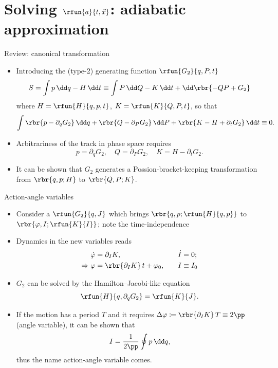 \documentclass{beamer}
\begin{document}
\section{Solving $\rfun{a}{t,\vec{x}}$: adiabatic approximation}

\begin{frame}{Review: canonical transformation}
\begin{itemize}
\item Introducing the (type-2) generating function $\rfun{G_2}{q, P, t}$
\begin{equation}
S = \int p\,\dd q - H \,\dd t
\equiv \int P\,\dd Q - K\,\dd t + \dd \rbr{-QP + G_2}
\end{equation}
where $H = \rfun{H}{q, p, t}$, $K = \rfun{K}{Q, P, t}$, so that
\begin{equation}
\int \rbr{p - \partial_q G_2}\,\dd q + \rbr{Q - \partial_P G_2}\,\dd P 
+ \rbr{K - H + \partial_t G_2}\,\dd t\equiv 0.
\end{equation}
\item Arbitrariness of the track in phase space requires
\begin{equation}
p = \partial_q G_2,\quad
Q = \partial_P G_2,\quad
K = H - \partial_t G_2.
\end{equation}
\item It can be shown that $G_2$ generates a Possion-bracket-keeping 
transformation from $\rbr{q, p; H}$ to $\rbr{Q, P; K}$.
\end{itemize}
\end{frame}

\begin{frame}{Action-angle variables}
\begin{itemize}
\item Consider a $\rfun{G_2}{q, J}$ which brings $\rbr{q, p; \rfun{H}{q, p}}$ 
to $\rbr{\varphi, I; \rfun{K}{I}}$; note the time-independence
\item Dynamics in the new variables reads
\begin{alignat}{3}
\dot \varphi &= \partial_I K,&\quad \dot I &= 0; \\
\Rightarrow \varphi &= \rbr{\partial_I K}\,t+\varphi_0,&\quad I &\equiv I_0
\end{alignat}
\item $G_2$ can be solved by the Hamilton--Jacobi-like equation
\begin{equation}
\rfun{H}{q, \partial_q G_2} = \rfun{K}{J}.
\end{equation}
\item If the motion has a period $T$ and it requires $\Delta \varphi \coloneqq 
\rbr{\partial_I K}\,T \equiv 2\pp$ (angle variable), it can be shown that
\begin{equation}
I = \frac{1}{2\pp}\oint p\,\dd q,
\end{equation}
thus the name action-angle variable comes.


\end{itemize}
\end{frame}
\end{document}

